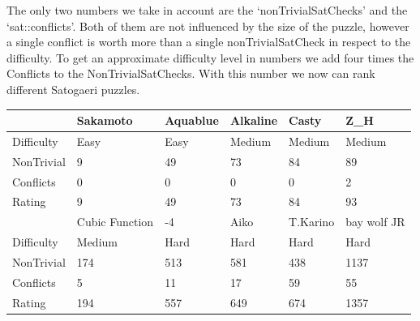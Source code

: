 The only two numbers we take in account are the `nonTrivialSatChecks' and the `sat::conflicts'. Both of them are not influenced by the size of the puzzle, however a single conflict is worth more than a single nonTrivialSatCheck in respect to the difficulty. To get an approximate difficulty level in numbers we add four times the Conflicts to the NonTrivialSatChecks. With this number we now can rank different Satogaeri puzzles.
\begin{center}
  \begin{tabular}{ | l | l | l | l | l | l | }
    \hline
     			 & Sakamoto & Aquablue 	& Alkaline 	& Casty		& Z\_H \\ \hline
    Difficulty 	& Easy 		& Easy 		& Medium 	& Medium 	& Medium \\ \hline
    NonTrivial 	& 9			& 49		& 73		& 84		& 89 \\ \hline
    Conflicts 	& 0			& 0			& 0			& 0			& 2	 \\ \hline
    Rating		& 9			& 49		& 73		& 84		& 93 \\ \hline
    \hline
     			& Cubic Function & -4 	& Aiko 	& T.Karino		& bay wolf JR \\ \hline
    Difficulty 	& Medium 		& Hard 		& Hard 	& Hard 		& Hard \\ \hline
    NonTrivial 	& 174			& 513		& 581	& 438		& 1137 \\ \hline
    Conflicts 	& 5				& 11		& 17	& 59		& 55 \\ \hline
    Rating		& 194			& 557		& 649	& 674		& 1357 \\ \hline
  \end{tabular}
\end{center}

